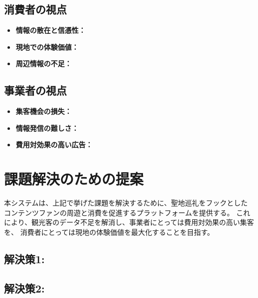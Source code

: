 \documentclass{docs}
\begin{document}
\subsection{消費者の視点}
\begin{itemize}
	\item \textbf{情報の散在と信憑性：}
	\item \textbf{現地での体験価値：}
	\item \textbf{周辺情報の不足：}
\end{itemize}


\subsection{事業者の視点}
\begin{itemize}
	\item \textbf{集客機会の損失：}
	\item \textbf{情報発信の難しさ：}
	\item \textbf{費用対効果の高い広告：}
\end{itemize}

\section{課題解決のための提案}

本システムは、上記で挙げた課題を解決するために、聖地巡礼をフックとした
コンテンツファンの周遊と消費を促進するプラットフォームを提供する。
これにより、観光客のデータ不足を解消し、事業者にとっては費用対効果の高い集客を、
消費者にとっては現地の体験価値を最大化することを目指す。



\subsection{解決策1: }

\subsection{解決策2: }
\end{document}
